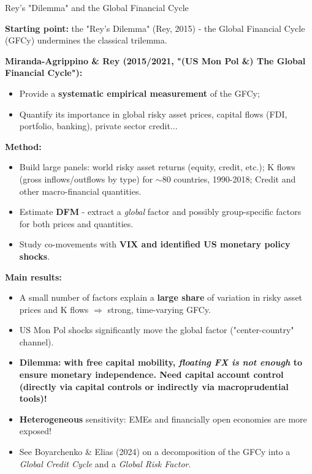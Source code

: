 \documentclass{beamer}
\begin{document}
\begin{frame}{Rey's "Dilemma" and the Global Financial Cycle}
\scriptsize

\textbf{Starting point:} the "Rey's Dilemma" (Rey, 2015) - the Global Financial Cycle (GFCy) undermines the classical trilemma.

\smallskip
\textbf{Miranda-Agrippino \& Rey (2015/2021, "(US Mon Pol \&) The Global Financial Cycle"):}
\begin{itemize}
  \item Provide a \textbf{systematic empirical measurement} of the GFCy;
  \item Quantify its importance in global risky asset prices, capital flows (FDI, portfolio, banking), private sector credit...
\end{itemize}

\textbf{Method: }
\begin{itemize}
  \item Build large panels: world risky asset returns (equity, credit, etc.); K flows (gross inflows/outflows by type) for $\sim$80 countries, 1990-2018; Credit and other macro-financial quantities.
  \item Estimate \textbf{DFM} - extract a \emph{global} factor and possibly group-specific factors for both prices and quantities.
  \item Study co-movements with \textbf{VIX and identified US monetary policy shocks}.
  \end{itemize}

\textbf{Main results:}
\begin{itemize}
  \item A small number of factors explain a \textbf{large share} of variation in risky asset prices and K flows $\Rightarrow$ strong, time-varying GFCy.
  \item US Mon Pol shocks significantly move the global factor
        ("center-country" channel).
        \item \textbf{Dilemma:} \textbf{with free capital mobility, \emph{floating FX is not enough} to ensure
        monetary independence. Need capital account control (directly via capital controls or indirectly via macroprudential tools)!}
  \item  \textbf{Heterogeneous} sensitivity: EMEs and financially open economies are more exposed!
  \item See Boyarchenko \& Elias (2024) on a decomposition of the GFCy into a \textit{Global Credit Cycle }and a \textit{Global Risk Factor}.
\end{itemize}

\end{frame}
\end{document}
